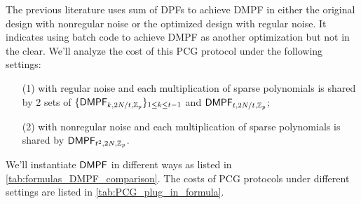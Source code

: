 The previous literature uses sum of DPFs to achieve DMPF in either the original design with nonregular noise or the optimized design with regular noise. It indicates using batch code to achieve DMPF as another optimization but not in the clear. We'll analyze the cost of this PCG protocol under the following settings:
\begin{itemize}
    \item[(1)]with regular noise and each multiplication of sparse polynomials is shared by 2 sets of $\{{\sf DMPF}_{k, 2N/t, \mathbb{Z}_p}\}_{1\le k\le t-1}$ and ${\sf DMPF}_{t, 2N/t, \mathbb{Z}_p}$;
    \item[(2)]with nonregular noise and each multiplication of sparse polynomials is shared by ${\sf DMPF}_{t^2, 2N, \mathbb{Z}_p}$. 
\end{itemize}
We'll instantiate ${\sf DMPF}$ in different ways as listed in \cref{tab:formulas_DMPF_comparison}. The costs of PCG protocols under different settings are listed in \cref{tab:PCG_plug_in_formula}. 
